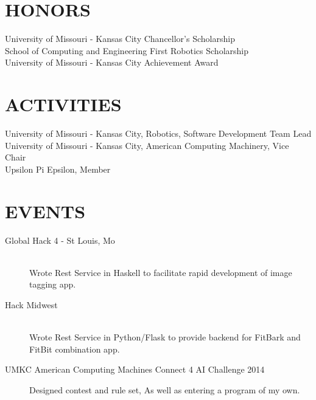 \documentclass[margin,11pt]{res} %
\begin{document}
\begin{resume}
 
 
\section{HONORS}
  University of Missouri - Kansas City Chancellor's Scholarship \\
  School of Computing and Engineering First Robotics Scholarship \\
  University of Missouri - Kansas City Achievement Award \\
 
\section{ACTIVITIES}     University of Missouri - Kansas City, Robotics, Software Development Team Lead \\
				University of Missouri - Kansas City, American Computing Machinery, Vice Chair \\
                                Upsilon Pi Epsilon, Member 
				
\section{EVENTS}
\begin{description}
\item [Global Hack 4 - St Louis, Mo] \hfill \\
   Wrote Rest Service in Haskell to facilitate rapid development of image tagging app.

\item [Hack Midwest] \hfill \\
  Wrote Rest Service in Python/Flask to provide backend for FitBark and FitBit combination app.

\item[UMKC American Computing Machines Connect 4 AI Challenge 2014] Designed contest and rule set, As well as entering a program of my own.
\end{description}
\end{resume} 
\end{document}
